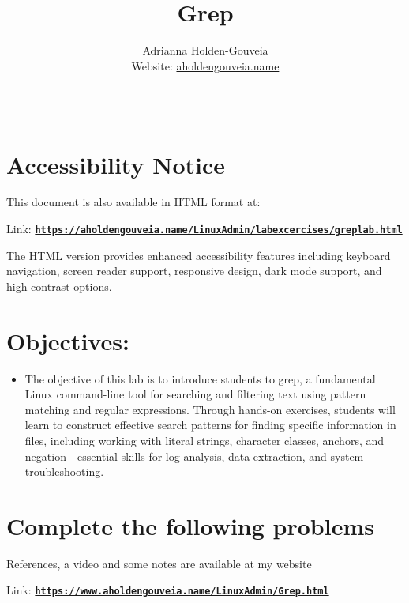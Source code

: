 \documentclass[12pt]{article}
\title{Grep}
\author{
        Adrianna Holden-Gouveia \\
        Website: \href{https://aholdengouveia.name}{aholdengouveia.name}\\
        \date{\vspace{-5ex}} 
        \faGithub {: aholdengouveia} \\
        }
\begin{document}
    

\maketitle



\section*{Accessibility Notice}
This document is also available in HTML format at:

Link: \href{https://aholdengouveia.name/LinuxAdmin/labexcercises/greplab.html}{\textbf{\nolinkurl{https://aholdengouveia.name/LinuxAdmin/labexcercises/greplab.html}}}

The HTML version provides enhanced accessibility features including keyboard navigation, screen reader support, responsive design, dark mode support, and high contrast options.

\section*{Objectives:}
\begin{itemize}
    \item The objective of this lab is to introduce students to grep, a fundamental Linux command-line tool for searching and filtering text using pattern matching and regular expressions. Through hands-on exercises, students will learn to construct effective search patterns for finding specific information in files, including working with literal strings, character classes, anchors, and negation—essential skills for log analysis, data extraction, and system troubleshooting.
\end{itemize}
\section*{Complete the following problems}

References, a video and some notes are available at my website

Link: \href{https://www.aholdengouveia.name/LinuxAdmin/Grep.html}{\textbf{\nolinkurl{https://www.aholdengouveia.name/LinuxAdmin/Grep.html}}}
\end{document}

